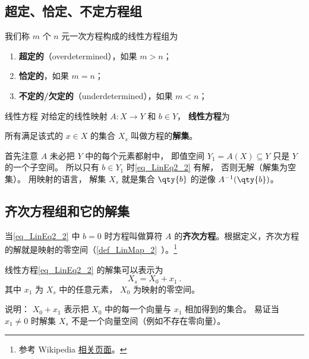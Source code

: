 \subsection{超定、恰定、不定方程组}

我们称 $m$ 个 $n$ 元一次方程构成的线性方程组为
\begin{enumerate}
\item \textbf{超定的}（overdetermined），如果 $m > n$；
\item \textbf{恰定的}，如果 $m = n$；
\item \textbf{不定的/欠定的}（underdetermined），如果 $m < n$；
\end{enumerate}

\begin{definition}{线性方程}
对给定的线性映射 $A:X\to Y$ 和 $b \in Y$， \textbf{线性方程}为

所有满足该式的 $x \in X$ 的集合 $X_s$ 叫做方程的\textbf{解集}。
\end{definition}

首先注意 $A$ 未必把 $Y$ 中的每个元素都射中， 即值空间 $Y_1 = A(X) \subseteq Y$ 只是 $Y$ 的一个子空间。 所以只有 $b \in Y_1$ 时\autoref{eq_LinEq2_2} 有解， 否则无解（解集为空集）。 用映射的语言， 解集 $X_s$ 就是集合 $\qty{b}$ 的逆像 $A^{-1}(\qty{b})$。


\subsection{齐次方程组和它的解集}






当\autoref{eq_LinEq2_2} 中 $b = 0$ 时方程叫做算符 $A$ 的\textbf{齐次方程}。根据定义，齐次方程的解就是映射的零空间（\autoref{def_LinMap_2}~）。\footnote{参考 Wikipedia \href{https://en.wikipedia.org/wiki/Kernel_(linear_algebra)}{相关页面}。}

\begin{theorem}{}\label{the_LinEq2_1}
线性方程\autoref{eq_LinEq2_2} 的解集可以表示为
\begin{equation}\label{eq_LinEq2_1}
X_s = X_0 + x_1~.
\end{equation}
其中 $x_1$ 为 $X_s$ 中的任意元素，  $X_0$ 为映射的零空间。
\end{theorem}
说明： $X_0 + x_1$ 表示把 $X_0$ 中的每一个向量与 $x_1$ 相加得到的集合。 易证当 $x_1 \ne 0$ 时解集 $X_s$ 不是一个向量空间（例如不存在零向量）。

